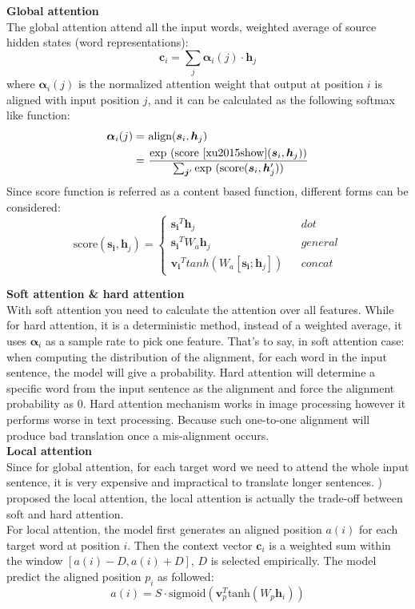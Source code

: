 \textbf{Global attention} \\
The global attention attend all the input words, weighted average of source hidden states (word representations):
\[ \bm{c}_i = \sum_{j} \bm{\alpha}_i(j)\cdot  \bm{h}_j \]
where $\bm{\alpha}_i(j)$ is the normalized attention weight that output at position $i$ is aligned with input position $j$, and it can be calculated as the following softmax like function:
\begin{align}
\bm{\alpha}_i(j) = & \ \text{align}(\bm{s}_i, {\bm{h}}_j) \\
= & \ \frac{\text{exp\ }(\text{score \cite{xu2015show}}(\bm{s}_i, {\bm{h}}_j))}{\sum_{\bm{j}^{\prime}} \text{exp\ }(\text{score}(\bm{s}_i, {\bm{h}}_j^{\prime}))}
\end{align}
Since score function is referred as a content based function, different forms can be considered:
\begin{equation}
\text{score}(\bm{s_i}, {\bm{h}}_j)=\left\{
\begin{array}{lcl}
{\bm{s_i}}^T {\bm{h}}_j & & dot\\
{\bm{s_i}}^T W_a {\bm{h}}_j & & general\\
{\bm{v_i}}^T tanh(W_a[\bm{s_i}; {\bm{h}}_j]) & & concat
\end{array} \right.
\end{equation}

 
\textbf{Soft attention \& hard attention }\\
With soft attention you need to calculate the attention over all features. While for hard attention, it is a deterministic method, instead of a weighted average, it uses $\bm{\alpha}_i$ as a sample rate to pick one feature.
That's to say, in soft attention case: when computing the distribution of the alignment, for each word in the input sentence, the model will give a probability. Hard attention will determine a specific word from the input sentence as the alignment and force the alignment probability as ${0}$.  Hard attention mechanism works in image processing however it performs worse in text processing. Because such one-to-one alignment will produce bad translation once a mis-alignment occurs. \\


\textbf{Local attention}\\
Since for global attention, for each target word we need to attend the whole input sentence, it is very expensive and impractical to translate longer sentences. \cite{luong2015effective}) proposed the local attention, the local attention is actually the  trade-off between soft and hard attention. \\
For local attention, the model first generates an aligned position ${a(i)}$ for each target word at position $i$. Then the context vector ${\bm{c}_i}$ is a weighted sum within the window ${[a(i)-D, a(i)+D]}$, ${D}$ is selected empirically. The model predict the aligned  position ${p_i}$ as followed:
\[ a(i) = S \cdot \text{sigmoid}(\bm{v}_p^T \text{tanh}(W_p \bm{h}_i))\]

